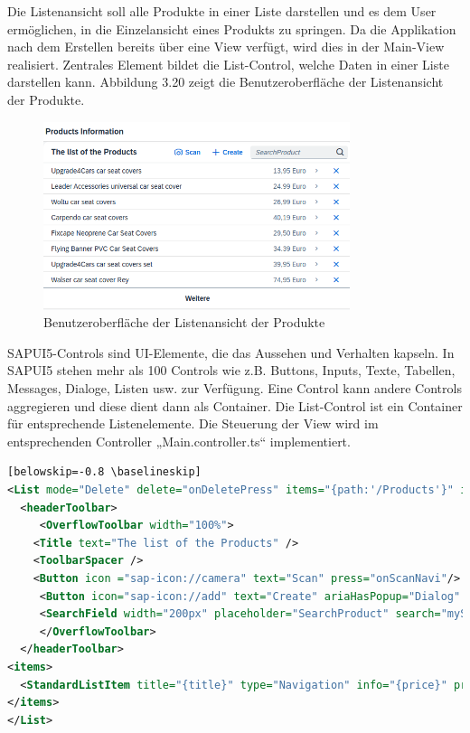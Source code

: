 Die Listenansicht soll alle Produkte in einer Liste darstellen und es dem User ermöglichen, in die Einzelansicht eines Produkts zu springen. Da die Applikation nach dem Erstellen bereits über eine View verfügt, wird dies in der Main-View realisiert. Zentrales Element bildet die List-Control, welche Daten in einer Liste darstellen kann. Abbildung 3.20 zeigt die Benutzeroberfläche der Listenansicht der Produkte.

\begin{figure}[htbp]
 \centering
 \includegraphics[width=0.8\textwidth]{Bilder/ui5 freestyle/3_20_Listeansicht.png}
 \caption{Benutzeroberfläche der Listenansicht der Produkte}
\end{figure}

SAPUI5-Controls sind UI-Elemente, die das Aussehen und Verhalten kapseln. In SAPUI5 stehen mehr als 100 Controls wie z.B. Buttons, Inputs, Texte, Tabellen, Messages, Dialoge, Listen usw. zur Verfügung. Eine Control kann andere Controls aggregieren und diese dient dann als Container. Die List-Control ist ein Container für entsprechende Listenelemente. Die Steuerung der View wird im entsprechenden Controller „Main.controller.ts“ implementiert. 

\begin{lstlisting}[language=XML][belowskip=-0.8 \baselineskip]
<List mode="Delete" delete="onDeletePress" items="{path:'/Products'}" id="productsList">
  <headerToolbar>
     <OverflowToolbar width="100%">
	<Title text="The list of the Products" />
	<ToolbarSpacer />
	<Button icon ="sap-icon://camera" text="Scan" press="onScanNavi"/>
     <Button icon="sap-icon://add" text="Create" ariaHasPopup="Dialog" press="pressAddInList" />
     <SearchField width="200px" placeholder="SearchProduct" search="mySearchProduct" />
     </OverflowToolbar>
  </headerToolbar>
<items>
  <StandardListItem title="{title}" type="Navigation" info="{price}" press="onItemPress"/>
</items>
</List>
\end{lstlisting}  

